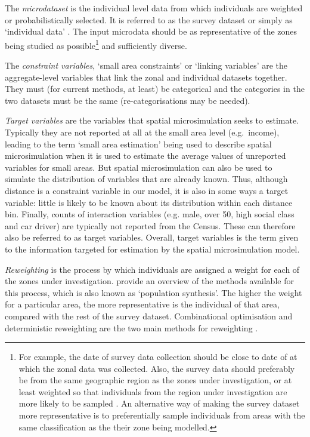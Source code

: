 The \emph{microdataset} is the individual level data from which individuals are
weighted or probabilistically selected. It is referred to as the survey
dataset \citep{Wu2008} or simply as `individual data' \citep{Simpson2005}.
The input microdata should be as representative of the zones being studied as
possible\footnote{For
example, the date of survey data collection should be
close to date of at which the zonal data was collected. Also, the survey data
should preferably be from the same geographic region as the zones under
investigation, or at least weighted so that individuals from the region under
investigation are more likely to be sampled \citep{Ballas2005-ireland}. An alternative
way of making the survey dataset more representative is to preferentially
sample individuals from areas with the same classification as the 
their zone being modelled.
}
and sufficiently diverse. %

The \emph{constraint variables}, `small area constraints' or `linking
variables' are the aggregate-level variables that link the zonal and individual
datasets together. They must (for current methods, at least)
be categorical and the categories in the two
datasets must be the same (re-categorisations may be needed).

\emph{Target variables} are the variables that spatial microsimulation seeks
to estimate. Typically they are not reported at all at the small area level
(e.g.~income), leading to the term `small area estimation' being used
to describe spatial microsimulation when it is used to estimate the
average values of unreported variables for small areas. But spatial
microsimulation can also be used to simulate the distribution of variables that
are already known. Thus, although distance is a constraint variable in
our model, it is also in some ways a target variable: 
little is likely to be known about its distribution within each distance bin. 
Finally, counts of interaction
variables (e.g. male, over 50,
high social class and car driver) are typically not reported from the Census.
These can therefore also be referred to as target variables. Overall,
target variables is the term given to the information targeted for
estimation by the spatial microsimulation model.

\emph{Reweighting} is the process by which individuals are assigned a weight
for each of the zones under investigation. \citet{harland2012} provide
an overview of the methods available for this process, which is
also known as `population synthesis'. The higher the weight for a
particular area, the more representative is the individual of that area,
compared with the rest of the survey dataset. Combinational optimisation
and deterministic reweighting 
are the two main methods for reweighting \citep{Hermes2012a}.


